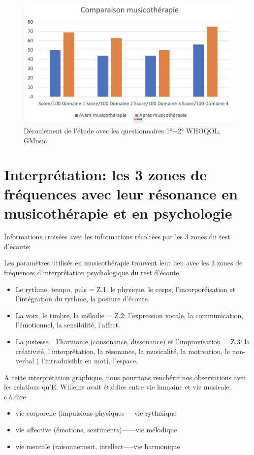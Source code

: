 \begin{figure}
\centering
\includegraphics[width=0.7\linewidth]{images/Compmusico.png}
\caption[Schéma du déroulement]{Déroulement de l'étude avec les
         questionnaires 1°+2° WHOQOL, GMusic.}
       
\label{groupecontroleimage1}
\end{figure}





  


\section{Interprétation: les 3 zones de fréquences avec leur résonance en musicothérapie et en
  psychologie}


	Informations croisées avec les informations récoltées par les 3 
          zones du test d'écoute:
          
Les paramètres utilisés en musicothérapie trouvent leur lien avec les
3 zones de fréquences d'interprétation psychologique du test d'écoute.
\begin{itemize}
 \item Le rythme, tempo, puls  =  Z.1: le physique, le corps, l'incorporéisation et
l'intégration du rythme,
la posture d'écoute.

\item La voix, le timbre, la mélodie =  Z.2:  l'expression vocale, la communication,
l'émotionnel, la sensibilité, l'affect.

\item La justesse= l'harmonie (consonance, dissonance) et l'improvisation = Z.3:  la créativité, l'interprétation, la
résonance, la musicalité, la motivation, le non-verbal (
l'intraduisible en mot), l'espace.
\end{itemize}
A cette interprétation graphique, nous pourrions renchérir nos
observations avec les relations
qu'E.
Willems  avait établies entre vie humaine et vie musicale, c.à.dire
\begin{itemize}
  \item vie corporelle (impulsions physiques-----vie rythmique
  \item vie affective (émotions, sentiments)------vie mélodique
    \item vie mentale (raisonnement, intellect-----vie harmonique
\end{itemize}

